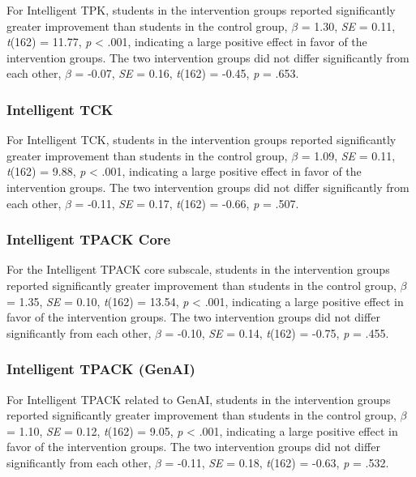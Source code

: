 \documentclass[
  letterpaper,
  DIV=11,
  numbers=noendperiod]{scrartcl}
\begin{document}
For Intelligent TPK, students in the intervention groups reported
significantly greater improvement than students in the control group,
\(\beta\) = 1.30, \emph{SE} = 0.11, \emph{t}(162) = 11.77, \emph{p}
\textless{} .001, indicating a large positive effect in favor of the
intervention groups. The two intervention groups did not differ
significantly from each other, \(\beta\) = -0.07, \emph{SE} = 0.16,
\emph{t}(162) = -0.45, \emph{p} = .653.

\subsubsection{Intelligent TCK}\label{intelligent-tck}

For Intelligent TCK, students in the intervention groups reported
significantly greater improvement than students in the control group,
\(\beta\) = 1.09, \emph{SE} = 0.11, \emph{t}(162) = 9.88, \emph{p}
\textless{} .001, indicating a large positive effect in favor of the
intervention groups. The two intervention groups did not differ
significantly from each other, \(\beta\) = -0.11, \emph{SE} = 0.17,
\emph{t}(162) = -0.66, \emph{p} = .507.

\subsubsection{Intelligent TPACK Core}\label{intelligent-tpack-core}

For the Intelligent TPACK core subscale, students in the intervention
groups reported significantly greater improvement than students in the
control group, \(\beta\) = 1.35, \emph{SE} = 0.10, \emph{t}(162) =
13.54, \emph{p} \textless{} .001, indicating a large positive effect in
favor of the intervention groups. The two intervention groups did not
differ significantly from each other, \(\beta\) = -0.10, \emph{SE} =
0.14, \emph{t}(162) = -0.75, \emph{p} = .455.

\subsubsection{Intelligent TPACK (GenAI)}\label{intelligent-tpack-genai}

For Intelligent TPACK related to GenAI, students in the intervention
groups reported significantly greater improvement than students in the
control group, \(\beta\) = 1.10, \emph{SE} = 0.12, \emph{t}(162) = 9.05,
\emph{p} \textless{} .001, indicating a large positive effect in favor
of the intervention groups. The two intervention groups did not differ
significantly from each other, \(\beta\) = -0.11, \emph{SE} = 0.18,
\emph{t}(162) = -0.63, \emph{p} = .532.
\end{document}
